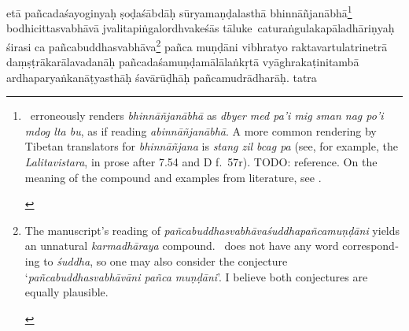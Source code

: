 \documentclass[naipra.tex]{subfiles}
\begin{document}
\begin{sanskrit}

\pstart
etā pañcadaśayoginyaḥ ṣoḍaśābdāḥ sūryamaṇḍalasthā bhinnāñjanābhā\footnote{\begin{english}
	\TIB\ erroneously renders \emph{bhinnāñjanābhā} as \emph{dbyer med pa'i mig sman nag po'i mdog lta bu}, as if reading \emph{abinnāñjanābhā}.
	A more common rendering by Tibetan translators for \emph{bhinnāñjana} is \emph{stang zil bcag pa} (see, for example, the \emph{Lalitavistara}, in prose after 7.54 and D f.\ 57r). TODO: reference.
	On the meaning of the compound and examples from literature, see \cite{vogel1968}.
\end{english}} bodhicittasvabhāvā jvalitapiṅgalordhvakeśās \crux tāluke\crux\ caturaṅgulakapāladhāriṇyaḥ śirasi ca pañcabuddhasvabhāva\footnote{\begin{english}
	The manuscript's reading of \emph{pañcabuddhasvabhāvaśuddhapañcamuṇḍāni} yields an unnatural \emph{karmadhāraya} compound.
	\TIB\ does not have any word corresponding to \emph{śuddha}, so one may also consider the conjecture `\emph{pañcabuddhasvabhāvāni pañca muṇḍāni}'.
	I believe both conjectures are equally plausible.
\end{english}} pañca muṇḍāni vibhratyo raktavartulatrinetrā daṃṣṭrākarālavadanāḥ pañcadaśamuṇḍamālālaṅkṛtā vyāghrakaṭinitambā ardhaparyaṅkanāṭyasthāḥ śavārūḍhāḥ pañcamudrādharāḥ. tatra\Emdash
\pend




\end{sanskrit}
\end{document}
